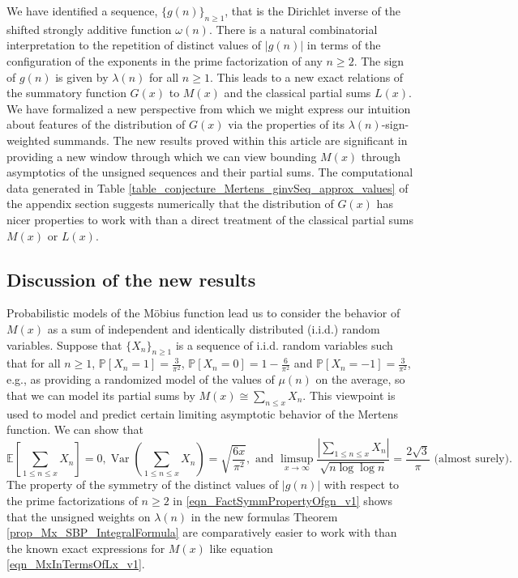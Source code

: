 \documentclass[11pt,reqno,a4letter]{article}
\newcommand{\hlocalref}[1]{\hyperref[#1]{\ref{#1}}}
\numberwithin{equation}{section}
\numberwithin{figure}{section}
\numberwithin{table}{section}
\theoremstyle{plain}
\numberwithin{theorem}{section}
\theoremstyle{definition}
\begin{document}
We have identified a sequence, 
$\{g(n)\}_{n \geq 1}$, that is the Dirichlet inverse of the 
shifted strongly additive function $\omega(n)$. 
There is a natural 
combinatorial interpretation to the repetition of distinct values 
of $|g(n)|$ in terms of the configuration of the 
exponents in the prime factorization of any $n \geq 2$. 
The sign of $g(n)$ is given by $\lambda(n)$ for all $n \geq 1$. 
This leads to a new exact relations of the 
summatory function $G(x)$ to $M(x)$ and the classical partial sums $L(x)$. 
We have formalized a new perspective from which we might express 
our intuition about features of the distribution of $G(x)$ 
via the properties of its $\lambda(n)$-sign-weighted summands.
The new results proved within this article 
are significant in providing a new window through which we can view bounding $M(x)$ 
through asymptotics of the unsigned sequences and their partial sums. 
The computational data generated in 
Table \hlocalref{table_conjecture_Mertens_ginvSeq_approx_values} of the appendix section 
suggests numerically that the distribution of $G(x)$ has nicer properties to work with 
than a direct treatment of the classical partial sums $M(x)$ or $L(x)$. 

\subsection{Discussion of the new results}

Probabilistic models of the M\"obius function lead us to consider the behavior of $M(x)$ 
as a sum of independent and identically distributed (i.i.d.) random variables. 
Suppose that $\{X_n\}_{n \geq 1}$ is a sequence of i.i.d. random variables 
such that for all $n \geq 1$, 
$\mathbb{P}[X_n = 1] = \frac{3}{\pi^2}$, $\mathbb{P}[X_n = 0] = 1 - \frac{6}{\pi^2}$ and 
$\mathbb{P}[X_n = -1] = \frac{3}{\pi^2}$, 
e.g., as providing a randomized model of the values of $\mu(n)$ on the average, 
so that we can model its partial sums by $M(x) \cong \sum_{n \leq x} X_n$. 
This viewpoint is used to model and predict certain limiting asymptotic behavior of the 
Mertens function. 
We can show that
\[
\mathbb{E}\left[\sum_{1 \leq n \leq x} X_n\right] = 0, 
     \operatorname{Var}\left(\sum_{1 \leq n \leq x} X_n\right) = \sqrt{\frac{6x}{\pi^2}}, 
     \text{ and } 
     \limsup_{x \rightarrow \infty} \frac{\left\lvert \sum\limits_{1 \leq n \leq x} X_n 
     \right\rvert}{\sqrt{n \log\log n}} = \frac{2\sqrt{3}}{\pi}
     \text{ (almost surely).} 
\]
The property of the symmetry of the distinct values of $|g(n)|$ with respect to the 
prime factorizations of $n \geq 2$ in \eqref{eqn_FactSymmPropertyOfgn_v1} 
shows that the unsigned weights on $\lambda(n)$ in 
the new formulas Theorem \hlocalref{prop_Mx_SBP_IntegralFormula} 
are comparatively easier to work with than the known 
exact expressions for $M(x)$ like equation \eqref{eqn_MxInTermsOfLx_v1}. 
\end{document}
